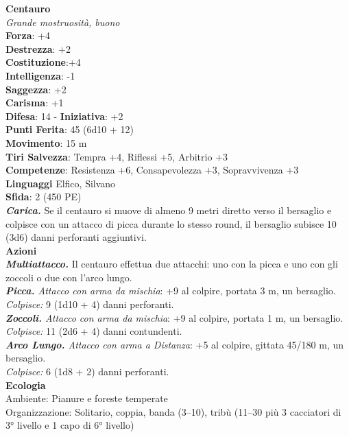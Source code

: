 \begin{multicols}{2}
\medskip\textbf{Centauro}\\
\emph{Grande mostruosità, buono}\\
\textbf{Forza}: +4\\
\textbf{Destrezza}: +2\\
\textbf{Costituzione}:+4 \\
\textbf{Intelligenza}: -1\\
\textbf{Saggezza}: +2\\
\textbf{Carisma}: +1\\
\textbf{Difesa}: 14 - \textbf{Iniziativa}: +2\\
\textbf{Punti Ferita}: 45 (6d10 + 12)\\
\textbf{Movimento}: 15 m\\
\textbf{Tiri Salvezza}: Tempra +4, Riflessi +5, Arbitrio +3\\
\textbf{Competenze}: Resistenza +6, Consapevolezza +3, Sopravvivenza +3\\
\textbf{Linguaggi} Elfico, Silvano\\
\textbf{Sfida}: 2 (450 PE)\smallskip\\
\emph{\textbf{Carica.}} Se il centauro si muove di almeno 9 metri diretto verso il bersaglio e colpisce con un attacco di picca durante lo stesso round, il bersaglio subisce 10 (3d6) danni perforanti aggiuntivi. \\
\smallskip\textbf{Azioni}\\
\emph{\textbf{Multiattacco.}} Il centauro effettua due attacchi: uno con la picca e uno con gli zoccoli o due con l'arco lungo.\\
\emph{\textbf{Picca.} Attacco con arma da mischia}: +9 al colpire, portata 3 m, un bersaglio.\\
\emph{Colpisce:} 9 (1d10 + 4) danni perforanti.\\
\emph{\textbf{Zoccoli.} Attacco con arma da mischia}: +9 al colpire, portata 1 m, un bersaglio.\\
\emph{Colpisce:} 11 (2d6 + 4) danni contundenti.\\
\emph{\textbf{Arco Lungo.} Attacco con arma a Distanza}: +5 al colpire, gittata 45/180 m, un bersaglio.\\
\emph{Colpisce:} 6 (1d8 + 2) danni perforanti.\\
\textbf{Ecologia}\\
Ambiente: Pianure e foreste temperate\\
Organizzazione: Solitario, coppia, banda (3–10), tribù (11–30 più 3 cacciatori di 3° livello e 1 capo di 6° livello)\\

\end{multicols}
